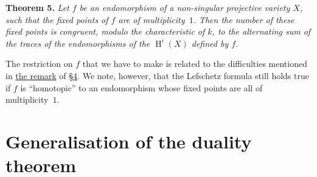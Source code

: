\documentclass{article}
\newenvironment{itenv}[1]
  {\phantomsection\par\medskip\noindent\textbf{#1.}\itshape}
  {\par\medskip}
\DeclareMathOperator{\HH}{H}
\begin{document}
\begin{itenv}{Theorem 5}
\label{theorem5}
  Let $f$ be an endomorphism of a non-singular projective variety $X$, such that the fixed points of $f$ are of multiplicity~$1$.
  Then the number of these fixed points is congruent, modulo the characteristic of $k$, to the alternating sum of the traces of the endomorphisms of the $\HH^i(X)$ defined by $f$.
\end{itenv}

The restriction on $f$ that we have to make is related to the difficulties mentioned in \hyperref[section4remark]{the remark} of \hyperref[section4]{\S4}.
We note, however, that the Lefschetz formula still holds true if $f$ is ``homotopic'' to an endomorphism whose fixed points are all of multiplicity~$1$.


\section{Generalisation of the duality theorem}
\label{section8}
\end{document}
